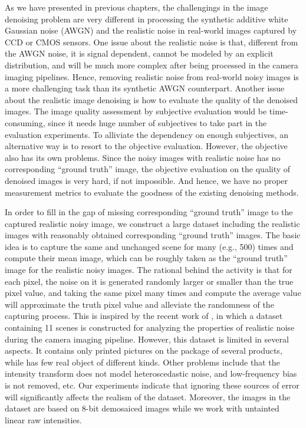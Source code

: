 As we have presented in previous chapters, the challengings in the image denoising problem are very different in processing the synthetic additive white Gaussian noise (AWGN) and the realistic noise in real-world images captured by CCD or CMOS sensors. One issue about the realistic noise is that, different from the AWGN noise, it is signal dependent, cannot be modeled by an explicit distribution, and will be much more complex after being processed in the camera imaging pipelines. Hence, removing realistic noise from real-world noisy images is a more challenging task than its synthetic AWGN counterpart. Another issue about the realistic image denoising is how to evaluate the quality of the denoised images. The image quality assessment by subjective evaluation would be time-consuming, since it needs huge number of subjectives to take part in the evaluation experiments. To alliviate the dependency on enough subjectives, an alternative way is to resort to the objective evaluation. However, the objective also has its own problems. Since the noisy images with realistic noise has no corresponding ``ground truth'' image, the objective evaluation on the quality of denoised images is very hard, if not impossible. And hence, we have no proper measurement metrics to evaluate the goodness of the existing denoising methods.

In order to fill in the gap of missing corresponding ``ground truth'' image to the captured realistic noisy image, we construct a large dataset including the realistic images with reasonably obtained corresponding ``ground truth'' images. The basic idea is to capture the same and unchanged scene for many (e.g., 500) times and compute their mean image, which can be roughly taken as the ``ground truth'' image for the realistic noisy images. The rational behind the activity is that for each pixel, the noise on it is generated randomly larger or smaller than the true pixel value, and taking the same pixel many times and compute the average value will approximate the truth pixel value and alleviate the randomness of the capturing process. This is inspired by the recent work of \cite{crosschannel2016}, in which a dataset containing 11 scenes is constructed for analyzing the properties of realistic noise during the camera imaging pipeline. However, this dataset is limited in several aspects. It contains only printed pictures on the package of several products, while has few real object of different kinds. Other problems include that the intensity transform does not model heteroscedastic noise, and low-frequency bias is not removed, etc. Our experiments indicate that ignoring these sources of error will significantly affects the realism of the dataset. Moreover, the images in the dataset \cite{crosschannel2016} are based on $8$-bit demosaiced images while we work with untainted linear raw intensities.

